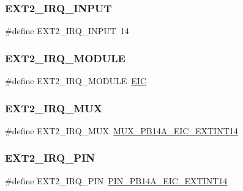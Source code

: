 \subsubsection{\texorpdfstring{EXT2\_IRQ\_INPUT}{EXT2\_IRQ\_INPUT}}
{\footnotesize\ttfamily \#define E\+X\+T2\+\_\+\+I\+R\+Q\+\_\+\+I\+N\+P\+UT~14}

\mbox{\label{group__samd21__xplained__pro__features__group_ga9c7d09aeb7bba32ec8bca4f14d66a70c}} 
\subsubsection{\texorpdfstring{EXT2\_IRQ\_MODULE}{EXT2\_IRQ\_MODULE}}
{\footnotesize\ttfamily \#define E\+X\+T2\+\_\+\+I\+R\+Q\+\_\+\+M\+O\+D\+U\+LE~\mbox{\hyperlink{group___s_a_m_d21_j18_a__base_ga27183a94584b5fca7e1207ce7a79782a}{E\+IC}}}

\mbox{\label{group__samd21__xplained__pro__features__group_ga4bb40e6d553d9016fbd69f3ccc79ebc0}} 
\subsubsection{\texorpdfstring{EXT2\_IRQ\_MUX}{EXT2\_IRQ\_MUX}}
{\footnotesize\ttfamily \#define E\+X\+T2\+\_\+\+I\+R\+Q\+\_\+\+M\+UX~\mbox{\hyperlink{pio_2samd21j18a_8h_ad29925a7b34bd6bcf03b3cace21ea476}{M\+U\+X\+\_\+\+P\+B14\+A\+\_\+\+E\+I\+C\+\_\+\+E\+X\+T\+I\+N\+T14}}}

\mbox{\label{group__samd21__xplained__pro__features__group_ga463f0f401aa67ecec8d09529eca77a68}} 
\subsubsection{\texorpdfstring{EXT2\_IRQ\_PIN}{EXT2\_IRQ\_PIN}}
{\footnotesize\ttfamily \#define E\+X\+T2\+\_\+\+I\+R\+Q\+\_\+\+P\+IN~\mbox{\hyperlink{pio_2samd21j18a_8h_a97b02a75f517744286a792170b1b7007}{P\+I\+N\+\_\+\+P\+B14\+A\+\_\+\+E\+I\+C\+\_\+\+E\+X\+T\+I\+N\+T14}}}

